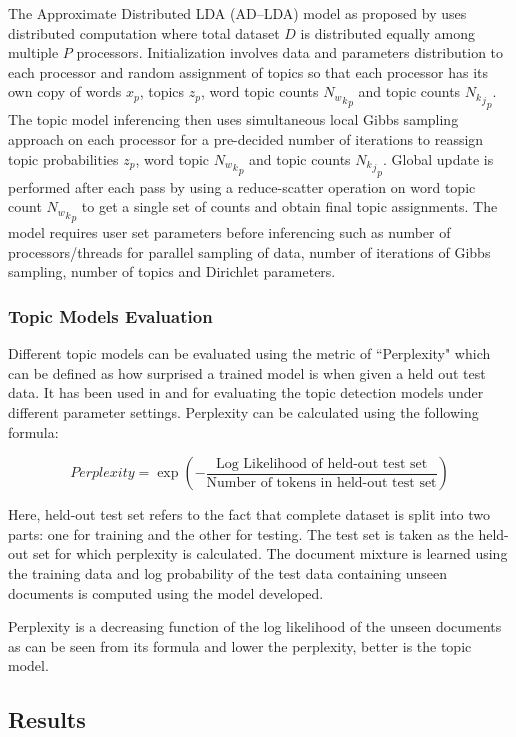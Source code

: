The Approximate Distributed LDA (AD--LDA) model as proposed by \cite{newman2009distributed} uses distributed computation where total dataset $D$ is distributed equally among multiple $P$ processors. Initialization involves data and parameters distribution to each processor and random assignment of topics so that each processor has its own copy of words $x_p$, topics $z_p$, word topic counts ${{N_w}_k}_p$ and topic counts ${{N_k}_j}_p$. 
The topic model inferencing then uses simultaneous local Gibbs sampling approach on each processor for a pre-decided number of iterations to reassign topic probabilities $z_p$, word topic ${{N_w}_k}_p$ and topic counts ${{N_k}_j}_p$.
Global update is performed after each pass by using a reduce-scatter operation on word topic count ${{N_w}_k}_p$ to get a single set of counts and obtain final topic assignments.
The model requires user set parameters before inferencing such as number of processors/threads for parallel sampling of data, number of iterations of Gibbs sampling, number of topics and Dirichlet parameters. 

\subsubsection{Topic Models Evaluation}

 Different topic models can be evaluated using the metric of ``Perplexity" which can be defined as how surprised a trained model is when given a held out test data. It has been used in \cite{newman2009distributed} and \cite{blei2003latent} for evaluating the topic detection models under different parameter settings. Perplexity can be calculated using the following formula:

$$Perplexity= \exp(-\dfrac{\text{Log Likelihood of held-out test set}}{\text{Number of tokens in held-out test set}})$$


Here, held-out test set refers to the fact that complete dataset is split into two parts: one for training and the other for testing. The test set is taken as the held-out set for which perplexity is calculated. The document mixture is learned using the training data and log probability of the test data containing unseen documents is computed using the model developed.

Perplexity is a decreasing function of the log likelihood of the unseen documents as can be seen from its formula and lower the perplexity, better is the topic model.

\subsection{Results}
\label{topic detection:result}

